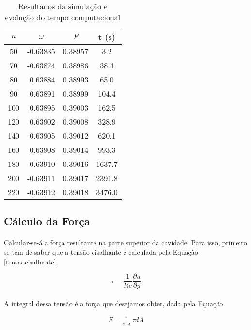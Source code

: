 \documentclass[validacao.tex]{subfiles}
\begin{document}
\begin{table}[!ht]
\centering
\begin{tabular}{|c|c|c|c|}
\hline
$n$ & $\omega$ & $F$ & t (s)\\ \hline
50	& -0.63835 &	0.38957 & 	3.2\\ \hline
70	&-0.63874  &	0.38986 & 	38.4\\ \hline
80	& -0.63884 &    0.38993	&   65.0\\ \hline
90	& -0.63891 &	0.38999 &	104.4\\ \hline
100	& -0.63895 &	0.39003 &	162.5\\ \hline
120	& -0.63902 &	0.39008 &	328.9\\ \hline
140	& -0.63905 &	0.39012 &	620.1\\ \hline
160	& -0.63908 &	0.39014 &	993.3\\ \hline
180	& -0.63910 &	0.39016 &	1637.7\\ \hline
200	& -0.63911 &	0.39017 &	2391.8\\ \hline
220	& -0.63912 &	0.39018 &	3476.0\\ \hline
\end{tabular}
\caption{Resultados da simulação e evolução do tempo computacional\label{comparacaonumericatable}}
\end{table}

\subsection{Cálculo da Força}

\paragraph{} Calcular-se-á a força resultante na parte superior da cavidade. Para isso, primeiro se tem de saber que a tensão cisalhante é calculada pela Equação \ref{tensaocisalhante}:

\begin{equation}
\tau = \frac{1}{\mathit{Re}} \frac{\partial u}{\partial y}\label{tensaocisalhante}
\end{equation}

\paragraph{} A integral dessa tensão é a força que desejamos obter, dada pela Equação

\begin{eqnarray}
F=\int_A {\tau dA}
\end{eqnarray}
\end{document}
